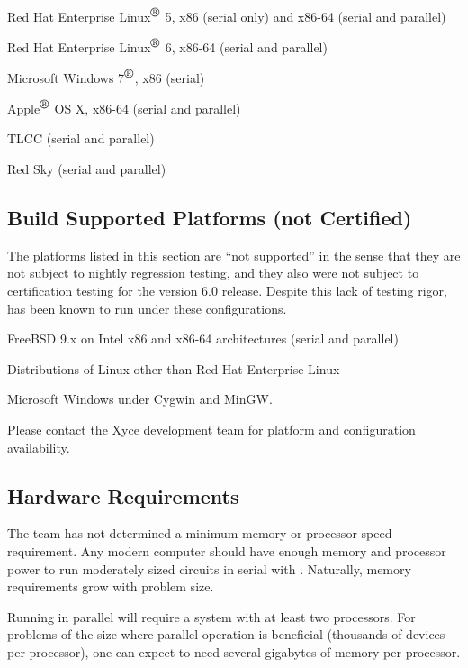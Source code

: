 \documentclass[11pt,report,strict]{SANDreport}
\begin{document}
\begin{XyceItemize}
\item Red Hat Enterprise Linux${}^{\mbox{\textregistered}}$ 5, x86 (serial only) and x86-64 (serial and parallel)
\item Red Hat Enterprise Linux${}^{\mbox{\textregistered}}$ 6, x86-64 (serial and parallel)
\item Microsoft Windows 7${}^{\mbox{\textregistered}}$, x86 (serial)
\item Apple${}^{\mbox{\textregistered}}$ OS X, x86-64 (serial and parallel)
\item TLCC (serial and parallel)
\item Red Sky (serial and parallel)
\end{XyceItemize}

\subsection{Build Supported Platforms (not Certified)}
The platforms listed in this section are ``not supported'' in the
sense that they are not subject to nightly regression testing, and
they also were not subject to certification testing for the \Xyce{}
version 6.0 release.  Despite this lack of testing rigor, \Xyce{} has
been known to run under these configurations.

\begin{XyceItemize}
\item FreeBSD 9.x on Intel x86 and x86-64 architectures (serial and parallel)
\item Distributions of Linux other than Red Hat Enterprise Linux
\item Microsoft Windows under Cygwin and MinGW.
\end{XyceItemize}

Please contact the Xyce development team for platform and configuration availability.

\subsection{Hardware Requirements}

The \Xyce{} team has not determined a minimum memory or processor
speed requirement.  Any modern computer should have enough memory and
processor power to run moderately sized circuits in serial with
\Xyce{}.  Naturally, memory requirements grow with problem size.  

Running \Xyce{} in parallel will require a system with at least two
processors. For problems of the size where parallel operation is
beneficial (thousands of devices per processor), one can expect to
need several gigabytes of memory per processor. 
\end{document}

